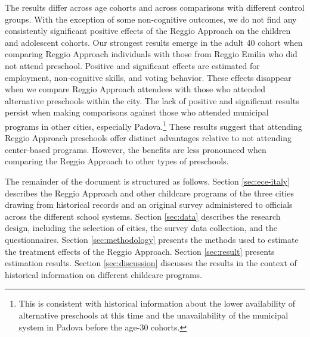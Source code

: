 The results differ across age cohorts and across comparisons with different control groups. With the exception of some non-cognitive outcomes, we do not find any consistently significant positive effects of the Reggio Approach on the children and adolescent cohorts. Our strongest results emerge in the adult 40 cohort when comparing Reggio Approach individuals with those from Reggio Emilia who did not attend preschool. Positive and significant effects are estimated for employment, non-cognitive skills, and voting behavior. These effects disappear when we compare Reggio Approach attendees with those who attended alternative preschools within the city. The lack of positive and significant results persist when making comparisons against those who attended municipal programs in other cities, especially Padova.\footnote{This is consistent with historical information about the lower availability of alternative preschools at this time and the unavailability of the municipal system in Padova before the age-30 cohorts.} These results suggest that attending Reggio Approach preschools offer distinct advantages relative to not attending center-based programs. However, the benefits are less pronounced when comparing the Reggio Approach to other types of preschools.

The remainder of the document is structured as follows. Section \ref{sec:ece-italy} describes the Reggio Approach and other childcare programs of the three cities drawing from historical records and an original survey administered to officials across the different school systems. Section \ref{sec:data} describes the research design, including the selection of cities, the survey data collection, and the questionnaires. Section \ref{sec:methodology} presents the methods used to estimate the treatment effects of the Reggio Approach. Section \ref{sec:result} presents estimation results. Section \ref{sec:discussion} discusses the results in the context of historical information on different childcare programs.

